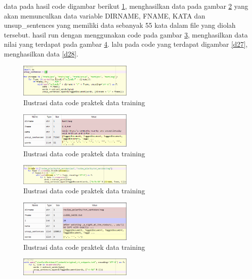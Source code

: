 \begin{enumerate}
data pada hasil code digambar berikut \ref{d23}, menghasilkan data pada gambar \ref{d24} yang akan memunculkan data variable DIRNAME, FNAME, KATA dan unsup\_sentences yang memiliki data sebanyak 55 kata dalam file yang diolah tersebut. hasil run dengan menggunakan code pada gambar \ref{d25}, menghasilkan data nilai yang terdapat pada gambar \ref{d26}. lalu pada code yang terdapat digambar \ref{d27}, menghasilkan data \ref{d28}.
\begin{figure}[!htbp]
	\centering
	\includegraphics[width=0.5\textwidth]{figures/fathi/chapter5/hari3/3}
	\caption{Ilustrasi data code praktek data training }
	\label{d23}
\end{figure}
\begin{figure}[!htbp]
	\centering
	\includegraphics[width=0.5\textwidth]{figures/fathi/chapter5/hari3/4}
	\caption{Ilustrasi data code praktek data training }
	\label{d24}
\end{figure}
\begin{figure}[!htbp]
	\centering
	\includegraphics[width=0.5\textwidth]{figures/fathi/chapter5/hari3/5}
	\caption{Ilustrasi data code praktek data training }
	\label{d25}
\end{figure}
\begin{figure}[!htbp]
	\centering
	\includegraphics[width=0.5\textwidth]{figures/fathi/chapter5/hari3/6}
	\caption{Ilustrasi data code praktek data training }
	\label{d26}
\end{figure}
\begin{figure}[!htbp]
	\centering
	\includegraphics[width=0.5\textwidth]{figures/fathi/chapter5/hari3/7}

\end{figure}
\end{enumerate}
